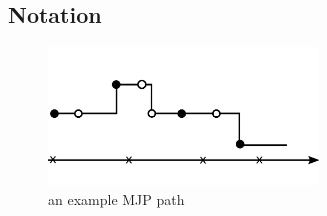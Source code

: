 \subsection{Notation}

\begin{figure}[H]
  \centering
  \begin{minipage}[H]{0.65\linewidth}
  \centering
    \includegraphics [width=0.64\textwidth, angle=0]{figs/VX.pdf}

  \end{minipage}
     \label{fig:vx}
\caption{an example MJP path}
  \end{figure}
